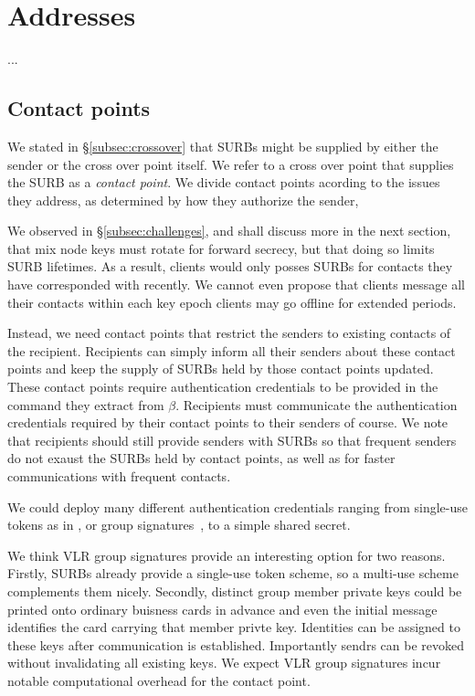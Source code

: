 
\section{Addresses}

...


\subsection{Contact points}

We stated in \S\ref{subsec:crossover} that SURBs might be supplied
by either the sender or the cross over point itself.  We refer to 
a cross over point that supplies the SURB as a {\em contact point}.
We divide contact points acording to the issues they address,
as determined by how they authorize the sender,

We observed in \S\ref{subsec:challenges}, and shall discuss more in
the next section, that mix node keys must rotate for forward secrecy,
but that doing so limits SURB lifetimes.  As a result, clients would
only posses SURBs for contacts they have corresponded with recently.
We cannot even propose that clients message all their contacts within
each key epoch clients may go offline for extended periods.

Instead, we need contact points that restrict the senders to existing
contacts of the recipient.  Recipients can simply inform all their
senders about these contact points and keep the supply of SURBs held
by those contact points updated.  These contact points require
authentication credentials to be provided in the command they extract
from $\beta$.  Recipients must communicate the authentication
credentials required by their contact points to their senders of course.
We note that recipients should still provide senders with SURBs so
that frequent senders do not exaust the SURBs held by contact points,
as well as for faster communications with frequent contacts.

We could deploy many different authentication credentials ranging 
from single-use tokens as in \cite{agl-pond-hmac}, or
 group signatures~\cite{BBS,VLR}, to a simple shared secret.

We think VLR group signatures \cite{VLR} provide an interesting
option for two reasons.  Firstly, SURBs already provide a single-use
token scheme, so a multi-use scheme complements them nicely.  
Secondly, distinct group member private keys could be printed onto
ordinary buisness cards in advance and even the initial message
identifies the card carrying that member privte key.  Identities
can be assigned to these keys after communication is established.  
Importantly sendrs can be revoked without invalidating all existing
keys.  We expect VLR group signatures incur notable computational
overhead for the contact point.  %

